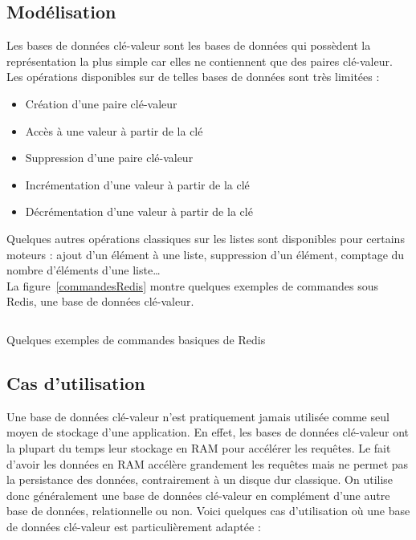 \subsection{Modélisation}
	Les bases de données clé-valeur sont les bases de données qui possèdent la représentation la plus simple car elles ne contiennent que des paires clé-valeur. Les opérations disponibles sur de telles bases de données sont très limitées :
	\begin{itemize}
		\item Création d'une paire clé-valeur 
		\item Accès à une valeur à partir de la clé
		\item Suppression d'une paire clé-valeur
		\item Incrémentation d'une valeur à partir de la clé
		\item Décrémentation d'une valeur à partir de la clé
	\end{itemize}
	\vspace{20px}
	Quelques autres opérations classiques sur les listes sont disponibles pour certains moteurs : ajout d'un élément à une liste, suppression d'un élément, comptage du nombre d'éléments d'une liste\dots\\

	La figure~\ref{commandesRedis} montre quelques exemples de commandes sous Redis, une base de données clé-valeur.

	\begin{listing}[H]
		\inputminted{text}{code/commandesRedis.txt}
		\caption{Quelques exemples de commandes basiques de Redis}
		\label{commandesRedis}
	\end{listing}

\subsection{Cas d'utilisation}
	Une base de données clé-valeur n'est pratiquement jamais utilisée comme seul moyen de stockage d'une application. En effet, les bases de données clé-valeur ont la plupart du temps leur stockage en RAM pour accélérer les requêtes. Le fait d'avoir les données en RAM accélère grandement les requêtes mais ne permet pas la persistance des données, contrairement à un disque dur classique. On utilise donc généralement une base de données clé-valeur en complément d'une autre base de données, relationnelle ou non. Voici quelques cas d'utilisation où une base de données clé-valeur est particulièrement adaptée :

